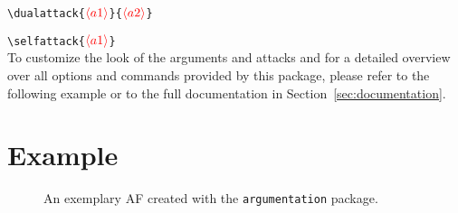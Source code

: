 \documentclass{article}
\newcommand{\argumentation}{\texttt{argumentation}\xspace}
\newcommand{\opt}[2][red]{\ensuremath{\textcolor{#1}{\langle #2\rangle}}}
\begin{document}
\vspace{-0.3cm}
\verb|\dualattack{|\opt{a1}\verb|}{|\opt{a2}\verb|}|

\verb|\selfattack{|\opt{a1}\verb|}|\\

\noindent
To customize the look of the arguments and attacks and for a detailed overview over all options and commands provided by this package, please refer to the following example or to the full documentation in Section~\ref{sec:documentation}.

\newpage\section{Example}\label{sec:example}
\vspace{-0.7cm}
\begin{figure}[ht]
    \centering
    \begin{af}



        

    \end{af}
    \caption{An exemplary AF created with the \argumentation package.}
    \label{fig:example}
\end{figure}
\vspace{-0.4cm}
\end{document}
